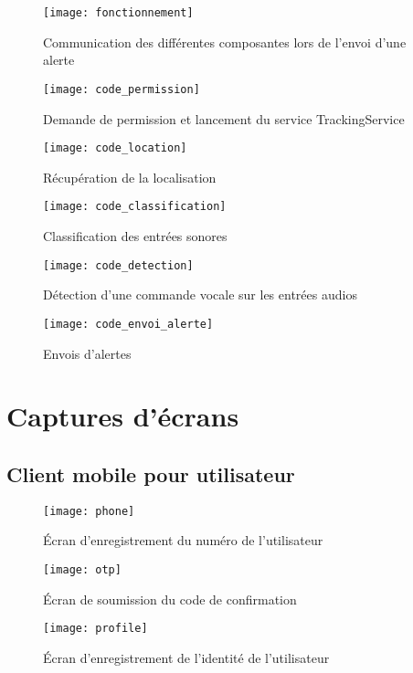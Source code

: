\begin{figure}[H]
	\centering
	\texttt{[image: fonctionnement]}
	\caption{Communication des différentes composantes lors de l’envoi d’une alerte}
\end{figure}

\begin{figure}[H]
	\centering
	\texttt{[image: code\_permission]}
	\caption{Demande de permission et lancement du service TrackingService}
\end{figure}

\begin{figure}[H]
	\centering
	\texttt{[image: code\_location]}
	\caption{Récupération de la localisation}
\end{figure}

\begin{figure}[H]
	\centering
	\texttt{[image: code\_classification]}
	\caption{Classification des entrées sonores}
\end{figure}

\begin{figure}[H]
	\centering
	\texttt{[image: code\_detection]}
	\caption{Détection d’une commande vocale sur les entrées audios}
\end{figure}

\begin{figure}[H]
	\centering
	\texttt{[image: code\_envoi\_alerte]}
	\caption{Envois d’alertes}
\end{figure}

\section{Captures d’écrans}
\subsection{Client mobile pour utilisateur}

\begin{figure}[H]
	\centering
	\texttt{[image: phone]}
	\caption{Écran d’enregistrement du numéro de l’utilisateur}
\end{figure}

\begin{figure}[H]
	\centering
	\texttt{[image: otp]}
	\caption{Écran de soumission du code de confirmation}
\end{figure}

\begin{figure}[H]
	\centering
	\texttt{[image: profile]}
	\caption{Écran d’enregistrement de l’identité de l’utilisateur}
\end{figure}


